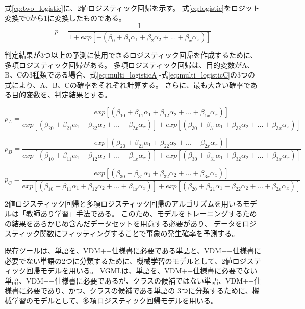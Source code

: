式\ref{ep:two_logistic}に、2値ロジスティック回帰を示す。
式\ref{eq:logistic}をロジット変換で0から1に変換したものである。
\begin{equation}\label{eq:two_logistic}
    p = \frac{1}{1+exp[- (\beta_{0}+ \beta_{1}\alpha_{1}+\beta_{2}\alpha_{2}+...+\beta_{x}\alpha_{x})]}
\end{equation}

判定結果が3つ以上の予測に使用できるロジスティック回帰を作成するために、多項ロジスティック回帰がある\cite{multinomial_logistic}。
多項ロジスティック回帰は、目的変数がA、B、Cの3種類である場合、式\ref{eq:multi_logisticA}-式\ref{eq:multi_logisticC}の3つの式により、A、B、Cの確率をそれぞれ計算する。
さらに、最も大きい確率である目的変数を、判定結果とする。

\begin{equation}\label{eq:multi_logisticA}
    p_{A} = \frac{exp[(\beta_{10}+ \beta_{11}\alpha_{1}+\beta_{12}\alpha_{2}+...+\beta_{1x}\alpha_{x})]}{exp[(\beta_{20}+ \beta_{21}\alpha_{1}+\beta_{22}\alpha_{2}+...+\beta_{2x}\alpha_{x})]+exp[(\beta_{30}+ \beta_{31}\alpha_{1}+\beta_{32}\alpha_{2}+...+\beta_{3x}\alpha_{x})]}
\end{equation}

\begin{equation}\label{eq:multi_logisticB}
    p_{B} = \frac{exp[(\beta_{20}+ \beta_{21}\alpha_{1}+\beta_{22}\alpha_{2}+...+\beta_{2x}\alpha_{x})]}{exp[(\beta_{10}+ \beta_{11}\alpha_{1}+\beta_{12}\alpha_{2}+...+\beta_{1x}\alpha_{x})]+exp[(\beta_{30}+ \beta_{31}\alpha_{1}+\beta_{32}\alpha_{2}+...+\beta_{3x}\alpha_{x})]}
\end{equation}

\begin{equation}\label{eq:multi_logisticC}
    p_{C} = \frac{exp[(\beta_{30}+ \beta_{31}\alpha_{1}+\beta_{32}\alpha_{2}+...+\beta_{3x}\alpha_{x})]}{exp[(\beta_{10}+ \beta_{11}\alpha_{1}+\beta_{12}\alpha_{2}+...+\beta_{1x}\alpha_{x})]+exp[(\beta_{20}+ \beta_{21}\alpha_{1}+\beta_{22}\alpha_{2}+...+\beta_{2x}\alpha_{x})]}
\end{equation}

2値ロジスティック回帰と多項ロジスティック回帰のアルゴリズムを用いるモデルは「教師あり学習」手法である。
このため、モデルをトレーニングするための結果をあらかじめ含んだデータセットを用意する必要があり、
データをロジスティック関数にフィッティングすることで事象の発生確率を予測する。

既存ツールは、単語を、VDM++仕様書に必要である単語と、VDM++仕様書に必要でない単語の2つに分類するために、機械学習のモデルとして、2値ロジスティック回帰モデルを用いる。
VGMLは、単語を、VDM++仕様書に必要でない単語、VDM++仕様書に必要であるが、クラスの候補ではない単語、VDM++仕様書に必要であり、かつ、クラスの候補である単語の
3つに分類するために、機械学習のモデルとして、多項ロジスティック回帰モデルを用いる。